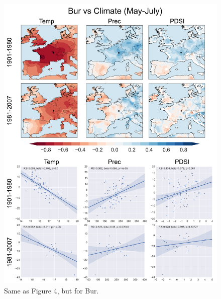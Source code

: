 \documentclass[12pt]{article}
\begin{document}
\begin{figure}
\center
\includegraphics[width=.9\columnwidth,scale=2]{SUPP_fig_06_Bur_MJJ_climate_onedeg.png}
\caption{Same as Figure 4, but for Bur.}
\end{figure}
\end{document}
